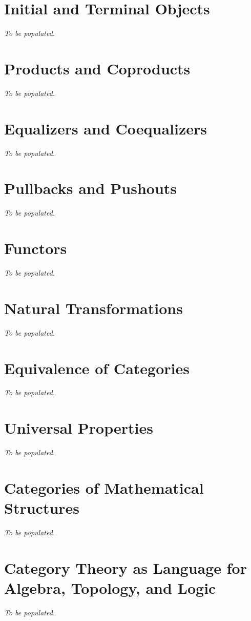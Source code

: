 \section{Initial and Terminal Objects}
\textit{To be populated.}

\section{Products and Coproducts}
\textit{To be populated.}

\section{Equalizers and Coequalizers}
\textit{To be populated.}

\section{Pullbacks and Pushouts}
\textit{To be populated.}

\section{Functors}
\textit{To be populated.}

\section{Natural Transformations}
\textit{To be populated.}

\section{Equivalence of Categories}
\textit{To be populated.}

\section{Universal Properties}
\textit{To be populated.}

\section{Categories of Mathematical Structures}
\textit{To be populated.}

\section{Category Theory as Language for Algebra, Topology, and Logic}
\textit{To be populated.}

